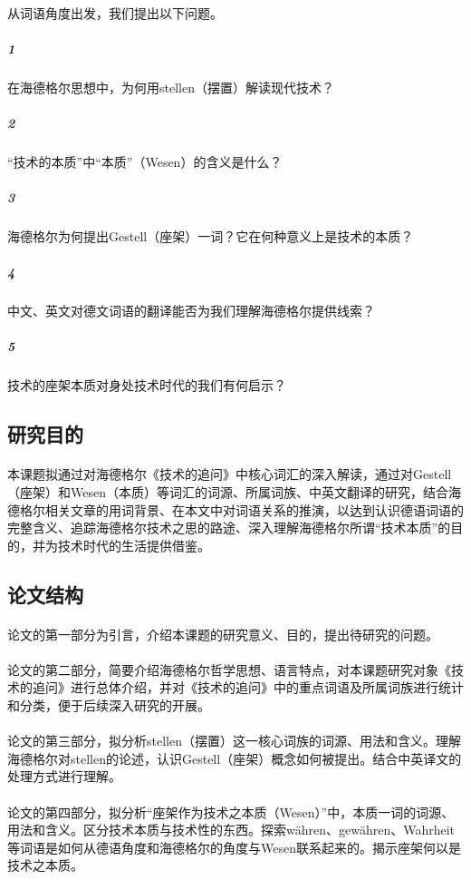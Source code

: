 \documentclass{article}
\begin{document}
		\paragraph{}
     	从词语角度出发，我们提出以下问题。
		\subparagraph{1} 
            在海德格尔思想中，为何用stellen（摆置）解读现代技术？
		\subparagraph{2} 
           “技术的本质”中“本质”（Wesen）的含义是什么？
		\subparagraph{3}海德格尔为何提出Gestell（座架）一词？它在何种意义上是技术的本质？
		\subparagraph{4}中文、英文对德文词语的翻译能否为我们理解海德格尔提供线索？
		\subparagraph{5}技术的座架本质对身处技术时代的我们有何启示？
	\subsection{研究目的}
		\paragraph{}
        本课题拟通过对海德格尔《技术的追问》中核心词汇的深入解读，通过对Gestell（座架）和Wesen（本质）等词汇的词源、所属词族、中英文翻译的研究，结合海德格尔相关文章的用词背景、在本文中对词语关系的推演，以达到认识德语词语的完整含义、追踪海德格尔技术之思的路途、深入理解海德格尔所谓“技术本质”的目的，并为技术时代的生活提供借鉴。
	\subsection{论文结构}
		\paragraph{}
        论文的第一部分为引言，介绍本课题的研究意义、目的，提出待研究的问题。
		\paragraph{}
        论文的第二部分，简要介绍海德格尔哲学思想、语言特点，对本课题研究对象《技术的追问》进行总体介绍，并对《技术的追问》中的重点词语及所属词族进行统计和分类，便于后续深入研究的开展。
        \paragraph{}
        论文的第三部分，拟分析stellen（摆置）这一核心词族的词源、用法和含义。理解海德格尔对stellen的论述，认识Gestell（座架）概念如何被提出。结合中英译文的处理方式进行理解。
        \paragraph{}
        论文的第四部分，拟分析“座架作为技术之本质（Wesen）”中，本质一词的词源、用法和含义。区分技术本质与技术性的东西。探索währen、gewähren、Wahrheit等词语是如何从德语角度和海德格尔的角度与Wesen联系起来的。揭示座架何以是技术之本质。
\end{document}
